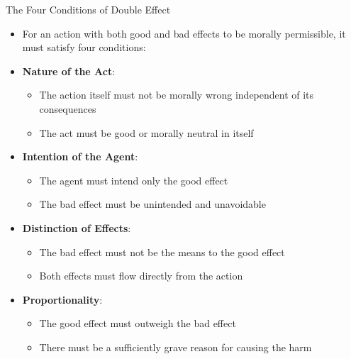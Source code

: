 \documentclass{beamer}
\begin{document}
\begin{frame}{The Four Conditions of Double Effect}
    \begin{itemize}
        \item For an action with both good and bad effects to be morally permissible, it must satisfy four conditions:
        
        \item \textbf{Nature of the Act}:
            \begin{itemize}
                \item The action itself must not be morally wrong independent of its consequences
                \item The act must be good or morally neutral in itself
            \end{itemize}
            
        \item \textbf{Intention of the Agent}:
            \begin{itemize}
                \item The agent must intend only the good effect
                \item The bad effect must be unintended and unavoidable
            \end{itemize}
            
        \item \textbf{Distinction of Effects}:
            \begin{itemize}
                \item The bad effect must not be the means to the good effect
                \item Both effects must flow directly from the action
            \end{itemize}
            
        \item \textbf{Proportionality}:
            \begin{itemize}
                \item The good effect must outweigh the bad effect
                \item There must be a sufficiently grave reason for causing the harm
            \end{itemize}
    \end{itemize}
\end{frame}
\end{document}
